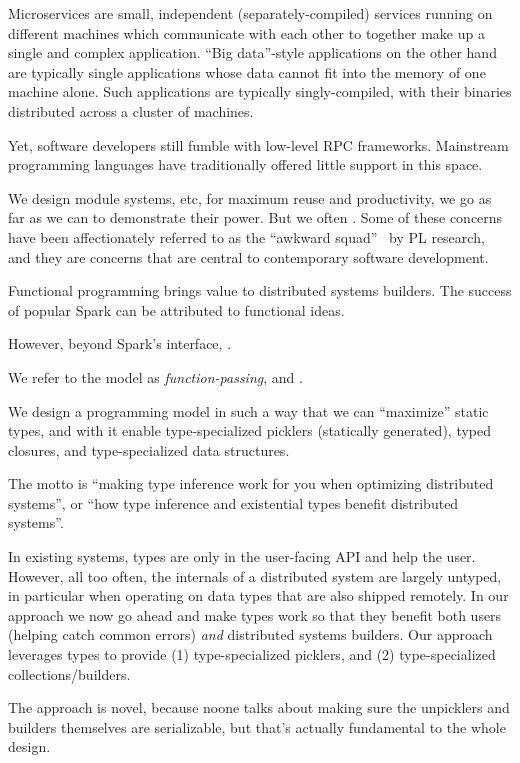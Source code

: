 \documentclass[preprint]{sigplanconf}
\theoremstyle{definition}
\theoremstyle{definition}
\begin{document}
Microservices are small, independent (separately-compiled) services running on
different machines which communicate with each other to together make up a
single and complex application. ``Big data''-style applications on the other
hand are typically single applications whose data cannot fit into the memory
of one machine alone. Such applications are typically singly-compiled, with
their binaries distributed across a cluster of machines.

Yet, software developers still fumble with low-level RPC frameworks.
Mainstream programming languages have traditionally offered little support in
this space.

We design module systems, etc, for maximum reuse and productivity, we go as
far as we can to demonstrate their power. But we often . Some of these
concerns have been affectionately referred to as the ``awkward
squad''~\cite{AwkwardSquad} by PL research, and they are concerns that are central to
contemporary software development.

Functional programming brings value to distributed systems builders. The
success of popular Spark can be attributed to functional ideas.

However, beyond Spark's interface, .

We refer to the model as {\em function-passing}, and .


We design a programming model in such a way that we can ``maximize'' static
types, and with it enable type-specialized picklers (statically generated),
typed closures, and type-specialized data structures.

The motto is ``making type inference work for you when optimizing distributed
systems'', or ``how type inference and existential types benefit distributed
systems''.

In existing systems, types are only in the user-facing API and help the user.
However, all too often, the internals of a distributed system are largely
untyped, in particular when operating on data types that are also shipped
remotely. In our approach we now go ahead and make types work so that they
benefit both users (helping catch common errors) \emph{and} distributed
systems builders. Our approach leverages types to provide (1) type-specialized
picklers, and (2) type-specialized collections/builders.

The approach is novel, because noone talks about making sure the unpicklers
and builders themselves are serializable, but that's actually fundamental to
the whole design.
\end{document}
